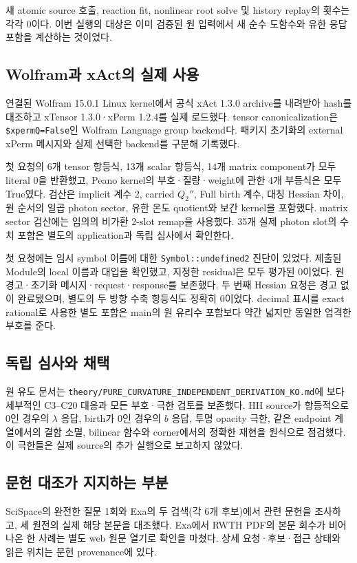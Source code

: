 새 atomic source 호출, reaction fit, nonlinear root solve 및 history replay의 횟수는
각각 0이다. 이번 실행의 대상은 이미 검증된 원 입력에서 새 순수 도함수와
유한 응답 포함을 계산하는 것이었다.

\subsection{Wolfram과 xAct의 실제 사용}
연결된 Wolfram 15.0.1 Linux kernel에서 공식
xAct 1.3.0 archive를 내려받아 hash를 대조하고
xTensor 1.3.0·xPerm 1.2.4를 실제 로드했다.
tensor canonicalization은 \texttt{\$xpermQ=False}인 Wolfram Language group backend다.
패키지 초기화의 external xPerm 메시지와 실제 선택한 backend를 구분해 기록했다.

첫 요청의 6개 tensor 항등식, 13개 scalar 항등식,
14개 matrix component가 모두 literal 0을 반환했고,
Peano kernel의 부호·질량·weight에 관한 4개 부등식은 모두 True였다.
검산은 implicit 계수 2,
carried $Q_2''$,
Full birth 계수,
대칭 Hessian 차이,
원 순서의 일곱 photon sector,
유한 온도 quotient와 보간 kernel을 포함했다.
matrix sector 검산에는 임의의 비가환 2-slot remap을 사용했다.
35개 실제 photon slot의 수치 포함은 별도의 application과 독립 심사에서 확인한다.

첫 요청에는 임시 symbol 이름에 대한
\texttt{Symbol::undefined2} 진단이 있었다.
제출된 Module의 local 이름과 대입을 확인했고,
지정한 residual은 모두 평가된 0이었다.
원 경고·초기화 메시지·request·response를 보존했다.
두 번째 Hessian 요청은 경고 없이 완료됐으며,
별도의 두 방향 수축 항등식도 정확히 0이었다.
decimal 표시를 exact rational로 사용한 별도 포함은
main의 원 유리수 포함보다 약간 넓지만 동일한 엄격한 부호를 준다.

\subsection{독립 심사와 채택}

원 유도 문서는
\texttt{theory/PURE\_CURVATURE\_INDEPENDENT\_DERIVATION\_KO.md}에
보다 세부적인 C3--C20 대응과 모든 부호·극한 검토를 보존했다.
HH source가 항등적으로 0인 경우의 $\lambda$ 응답,
birth가 0인 경우의 $b$ 응답,
투명 opacity 극한,
같은 endpoint 계열에서의 결함 소멸,
bilinear 함수와 corner에서의 정확한 재현을 원식으로 점검했다.
이 극한들은 실제 source의 추가 실행으로 보고하지 않았다.

\subsection{문헌 대조가 지지하는 부분}
SciSpace의 완전한 질문 1회와 Exa의 두 검색(각 6개 후보)에서
관련 문헌을 조사하고, 세 원전의 실제 해당 본문을 대조했다.
Exa에서 RWTH PDF의 본문 회수가 비어 나온 한 사례는
별도 web 원문 열기로 확인을 마쳤다.
상세 요청·후보·접근 상태와 읽은 위치는 문헌 provenance에 있다.

